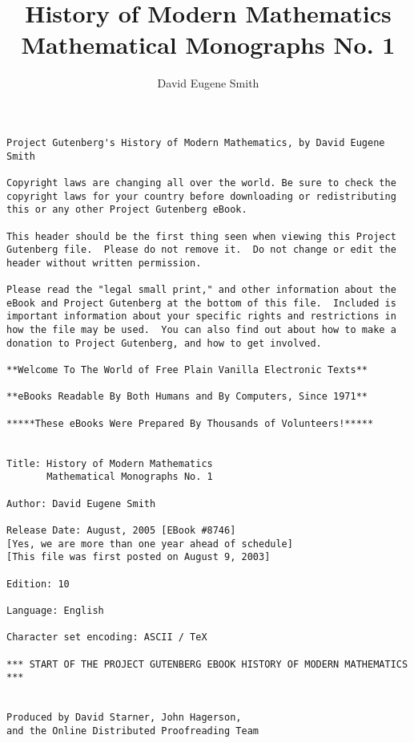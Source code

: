 \documentclass[oneside]{book}
\title{History of Modern Mathematics Mathematical Monographs No. 1}
\author{David Eugene Smith}
\begin{document}
\newenvironment{license}{}{}
\renewenvironment{titlepage}{\center}{\endcenter}
\newenvironment{series}{}{}

\thispagestyle{empty}



\small
\begin{license}
\begin{verbatim}
Project Gutenberg's History of Modern Mathematics, by David Eugene Smith

Copyright laws are changing all over the world. Be sure to check the
copyright laws for your country before downloading or redistributing
this or any other Project Gutenberg eBook.

This header should be the first thing seen when viewing this Project
Gutenberg file.  Please do not remove it.  Do not change or edit the
header without written permission.

Please read the "legal small print," and other information about the
eBook and Project Gutenberg at the bottom of this file.  Included is
important information about your specific rights and restrictions in
how the file may be used.  You can also find out about how to make a
donation to Project Gutenberg, and how to get involved.

**Welcome To The World of Free Plain Vanilla Electronic Texts**

**eBooks Readable By Both Humans and By Computers, Since 1971**

*****These eBooks Were Prepared By Thousands of Volunteers!*****


Title: History of Modern Mathematics
       Mathematical Monographs No. 1

Author: David Eugene Smith

Release Date: August, 2005 [EBook #8746]
[Yes, we are more than one year ahead of schedule]
[This file was first posted on August 9, 2003]

Edition: 10

Language: English

Character set encoding: ASCII / TeX

*** START OF THE PROJECT GUTENBERG EBOOK HISTORY OF MODERN MATHEMATICS ***


Produced by David Starner, John Hagerson,
and the Online Distributed Proofreading Team

\end{verbatim}
\end{license} 
\normalsize
\newpage
\end{document}
